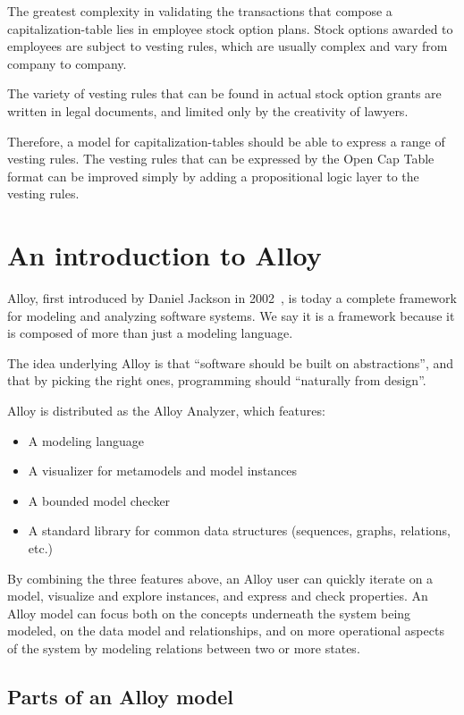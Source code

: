 The greatest complexity in validating the transactions that compose a \gls{capitalization-table} lies in employee stock option plans. Stock options awarded to employees are subject to vesting rules, which are usually complex and vary from company to company.

The variety of vesting rules that can be found in actual stock option grants are written in legal documents, and limited only by the creativity of lawyers.

Therefore, a model for \glspl{capitalization-table} should be able to express a range of vesting rules. The vesting rules that can be expressed by the Open Cap Table format can be improved simply by adding a propositional logic layer to the vesting rules.

\section{An introduction to Alloy}

Alloy, first introduced by Daniel Jackson in 2002~\cite{jackson-2002}, is today a complete framework for modeling and analyzing software systems. We say it is a framework because it is composed of more than just a modeling language.

The idea underlying Alloy is that ``software should be built on abstractions'', and that by picking the right ones, programming should ``naturally from design''.

Alloy is distributed as the Alloy Analyzer, which features:

\begin{itemize}
	\item A modeling language
	\item A visualizer for metamodels and model instances
	\item A bounded model checker
	\item A standard library for common data structures (sequences, graphs, relations, etc.)
\end{itemize}

By combining the three features above, an Alloy user can quickly iterate on a model, visualize and explore instances, and express and check properties. An Alloy model can focus both on the concepts underneath the system being modeled, on the data model and relationships, and on more operational aspects of the system by modeling relations between two or more states.

\subsection{Parts of an Alloy model}

